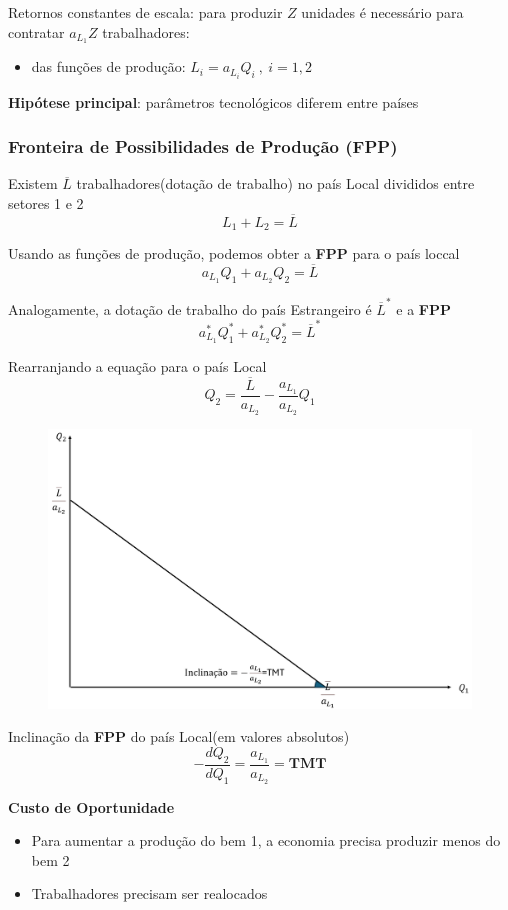 \documentclass[a4paper,12pt]{article}[abntex2]
\begin{document}
Retornos constantes de escala: para produzir \(Z\) unidades é necessário para contratar \(a_{L_1}Z\) trabalhadores:\begin{itemize}
    \item das funções de produção: \(L_i=a_{L_i}Q_i \ , \ i=1,2\)
\end{itemize}

\textbf{Hipótese principal}: parâmetros tecnológicos diferem entre países

\subsubsection{\textbf{Fronteira de Possibilidades de Produção (FPP)}}

Existem \(\overline{L}\) trabalhadores(dotação de trabalho) no país Local divididos entre setores 1 e 2
\[
L_1+L_2=\overline{L}
\]

Usando as funções de produção, podemos obter a \textbf{FPP} para o país loccal
\[
a_{L_1}Q_1+a_{L_2}Q_2=\overline{L}
\]

Analogamente, a dotação de trabalho do país Estrangeiro é \(\overline{L}^*\) e a \textbf{FPP}
\[
a_{L_1}^*Q_1^*+a_{L_2}^*Q_2^*=\overline{L}^*
\]

Rearranjando a equação para o país Local
\[
Q_2=\frac{\overline{L}}{a_{L_2}}-\frac{a_{L_1}}{a_{L_2}}Q_1
\]

\begin{figure}[H]
    \centering
    \includegraphics[width=0.7\linewidth]{Imagens/a7i4.png}
\end{figure}

Inclinação da \textbf{FPP} do país Local(em valores absolutos)
\[
-\frac{dQ_2}{dQ_1}=\frac{a_{L_1}}{a_{L_2}}=\textbf{TMT}
\]

\textbf{Custo de Oportunidade}\begin{itemize}
    \item Para aumentar a produção do bem 1, a economia precisa produzir menos do bem 2
    \item Trabalhadores precisam ser realocados
\end{itemize}
\end{document}
